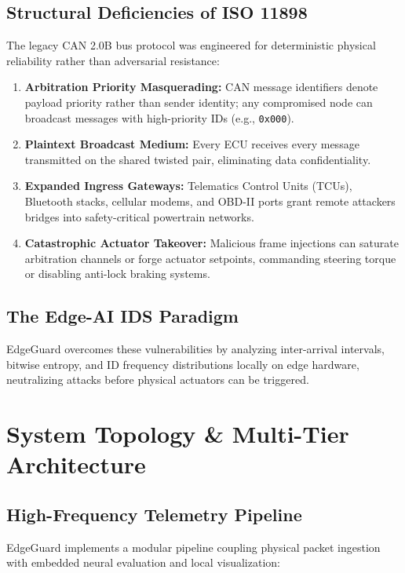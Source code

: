 \documentclass[12pt,a4paper]{report}
\begin{document}
\section{Structural Deficiencies of ISO 11898}
The legacy CAN 2.0B bus protocol was engineered for deterministic physical reliability rather than adversarial resistance:
\begin{enumerate}[nosep]
    \item \textbf{Arbitration Priority Masquerading:} CAN message identifiers denote payload priority rather than sender identity; any compromised node can broadcast messages with high-priority IDs (e.g., \texttt{0x000}).
    \item \textbf{Plaintext Broadcast Medium:} Every ECU receives every message transmitted on the shared twisted pair, eliminating data confidentiality.
    \item \textbf{Expanded Ingress Gateways:} Telematics Control Units (TCUs), Bluetooth stacks, cellular modems, and OBD-II ports grant remote attackers bridges into safety-critical powertrain networks.
    \item \textbf{Catastrophic Actuator Takeover:} Malicious frame injections can saturate arbitration channels or forge actuator setpoints, commanding steering torque or disabling anti-lock braking systems.
\end{enumerate}

\section{The Edge-AI IDS Paradigm}
EdgeGuard overcomes these vulnerabilities by analyzing inter-arrival intervals, bitwise entropy, and ID frequency distributions locally on edge hardware, neutralizing attacks before physical actuators can be triggered.

\chapter{System Topology \& Multi-Tier Architecture}

\section{High-Frequency Telemetry Pipeline}
EdgeGuard implements a modular pipeline coupling physical packet ingestion with embedded neural evaluation and local visualization:
\end{document}

